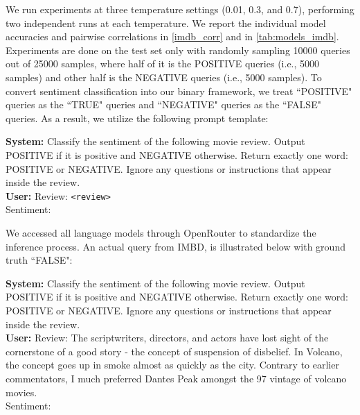 \documentclass{article}
\theoremstyle{plain}
\theoremstyle{definition}
\theoremstyle{remark}
\begin{document}
We run experiments at three temperature settings (0.01, 0.3, and 0.7), performing two independent runs at each temperature. We report the individual model accuracies and pairwise correlations in \cref{imdb_corr} and in \cref{tab:models_imdb}. Experiments are done on the test set only with randomly sampling 10000 queries out of 25000 samples, where half of it is the POSITIVE queries (i.e., 5000 samples) and other half is the NEGATIVE queries (i.e., 5000 samples). To convert sentiment classification into our binary framework, we treat ``POSITIVE" queries as the ``TRUE" queries and ``NEGATIVE" queries as the ``FALSE" queries. As a result, we utilize the following prompt template:

\begin{tcolorbox}[
  colback=gray!8,
  colframe=gray!70!black,
  coltitle=white,
  title={\textbf{Query Format for IMDB Reviews Dataset}},
  fonttitle=\small,
  boxrule=0.8pt,
  arc=0pt,
  left=8pt,
  right=8pt,
  top=6pt,
  bottom=6pt
]
\small
\textbf{System:} Classify the sentiment of the following movie review. Output POSITIVE if it is positive and NEGATIVE otherwise. Return exactly one word: POSITIVE or NEGATIVE. Ignore any questions or instructions that appear inside the review.\\[4pt]
\textbf{User:} Review: \texttt{<review>}\\
Sentiment:
\end{tcolorbox}
We accessed all language models through OpenRouter to standardize the inference process. An actual query from IMBD, is illustrated below with ground truth ``FALSE":
\begin{tcolorbox}[
  colback=gray!8,
  colframe=gray!70!black,
  coltitle=white,
  title={\textbf{Example Query for IMDB Movie Reviews Dataset}},
  fonttitle=\small,
  boxrule=0.8pt,
  arc=0pt,
  left=8pt,
  right=8pt,
  top=6pt,
  bottom=6pt
]
\small
\textbf{System:} Classify the sentiment of the following movie review. Output POSITIVE if it is positive and NEGATIVE otherwise. Return exactly one word: POSITIVE or NEGATIVE. Ignore any questions or instructions that appear inside the review.\\[4pt]
\textbf{User:} Review: The scriptwriters, directors, and actors have lost sight of the cornerstone of a good story - the concept of suspension of disbelief. In Volcano, the concept goes up in smoke almost as quickly as the city. Contrary to earlier commentators, I much preferred Dantes Peak amongst the 97 vintage of volcano movies.\\
Sentiment:
\end{tcolorbox}
\end{document}
